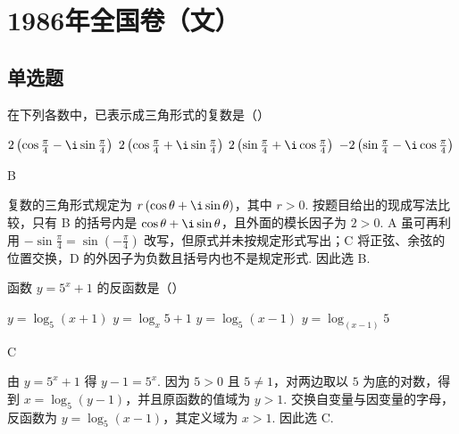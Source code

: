 \documentclass[UTF8,a4paper,oneside,11pt]{ctexbook}
\begin{document}
\mainmatter

\chapter{1986年全国卷（文）}

\section{单选题}

\begin{problem}
在下列各数中，已表示成三角形式的复数是（\quad）

\choices
    {\(2\left(\cos \frac{\pi}{4} - \i\sin \frac{\pi}{4}\right)\)}
    {\(2\left(\cos \frac{\pi}{4} + \i\sin \frac{\pi}{4}\right)\)}
    {\(2\left(\sin \frac{\pi}{4} + \i\cos \frac{\pi}{4}\right)\)}
    {\(-2\left(\sin \frac{\pi}{4} - \i\cos \frac{\pi}{4}\right)\)}
\end{problem}

\begin{answer}
B
\end{answer}

\begin{solution}
复数的三角形式规定为 \(r\left(\cos\theta+\i\sin\theta\right)\)，其中 \(r>0\). 按题目给出的现成写法比较，只有 B 的括号内是 \(\cos\theta+\i\sin\theta\)，且外面的模长因子为 \(2>0\). A 虽可再利用 \(-\sin\frac{\pi}{4}=\sin\left(-\frac{\pi}{4}\right)\) 改写，但原式并未按规定形式写出；C 将正弦、余弦的位置交换，D 的外因子为负数且括号内也不是规定形式. 因此选 B.
\end{solution}

\begin{problem}
函数 \(y = 5^x + 1\) 的反函数是（\quad）

\choices
    {\(y = \log_5(x + 1)\)}
    {\(y = \log_x 5 + 1\)}
    {\(y = \log_5(x - 1)\)}
    {\(y = \log_{\left(x - 1\right)} 5\)}
\end{problem}

\begin{answer}
C
\end{answer}

\begin{solution}
由 \(y=5^x+1\) 得 \(y-1=5^x\). 因为 \(5>0\) 且 \(5\neq1\)，对两边取以 \(5\) 为底的对数，得到 \(x=\log_5(y-1)\)，并且原函数的值域为 \(y>1\). 交换自变量与因变量的字母，反函数为 \(y=\log_5(x-1)\)，其定义域为 \(x>1\). 因此选 C.
\end{solution}
\end{document}
